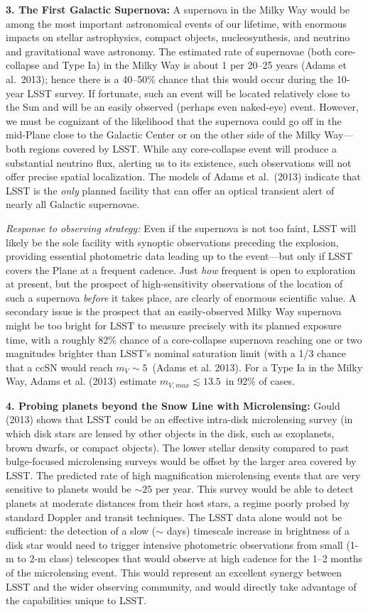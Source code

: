 {\bf 3. The First Galactic Supernova:} A supernova in the Milky Way
would be among the most important astronomical events of our lifetime,
with enormous impacts on stellar astrophysics, compact objects,
nucleosynthesis, and neutrino and gravitational wave astronomy. The
estimated rate of supernovae (both core-collapse and Type Ia) in the
Milky Way is about 1 per 20--25 years (Adams et al.~2013); hence there
is a 40--50\% chance that this would occur during the 10-year LSST
survey. If fortunate, such an event will be located relatively close
to the Sun and will be an easily observed (perhaps even naked-eye)
event. However, we must be cognizant of the likelihood that the
supernova could go off in the mid-Plane close to the Galactic Center
or on the other side of the Milky Way---both regions covered by
LSST. While any core-collapse event will produce a substantial
neutrino flux, alerting us to its existence, such observations will
not offer precise spatial localization. The models of Adams et
al.~(2013) indicate that LSST is the \emph{only} planned facility that
can offer an optical transient alert of nearly all Galactic
supernovae. 

{\it Response to observing strategy:} Even if the supernova is not too
faint, LSST will likely be the sole facility with synoptic
observations preceding the explosion, providing essential photometric
data leading up to the event---but only if LSST covers the Plane at a
frequent cadence. Just {\it how} frequent is open to exploration at
present, but the prospect of high-sensitivity observations of the
location of such a supernova {\it before} it takes place, are clearly
of enormous scientific value. A secondary issue is the prospect that
an easily-observed Milky Way supernova might be too bright for LSST to
measure precisely with its planned exposure time, with a roughly 82\%
chance of a core-collapse supernova reaching one or two magnitudes
brighter than LSST's nominal saturation limit (with a 1/3 chance that
a ccSN would reach $m_V \sim 5$~(Adams et al. 2013). For a Type Ia in
the Milky Way, Adams et al. (2013) estimate $m_{V, max} \lesssim
13.5$~in 92\% of cases.

{\bf 4. Probing planets beyond the Snow Line with Microlensing:} Gould
(2013) shows that LSST could be an effective intra-disk microlensing
survey (in which disk stars are lensed by other objects in the disk,
such as exoplanets, brown dwarfs, or compact objects). The lower
stellar density compared to past bulge-focused microlensing surveys
would be offset by the larger area covered by LSST. The predicted rate
of high magnification microlensing events that are very sensitive to
planets would be $\sim 25$ per year. This survey would be able to
detect planets at moderate distances from their host stars, a regime
poorly probed by standard Doppler and transit techniques. The LSST
data alone would not be sufficient: the detection of a slow ($\sim$
days) timescale increase in brightness of a disk star would need to
trigger intensive photometric observations from small (1-m to 2-m
class) telescopes that would observe at high cadence for the 1--2
months of the microlensing event. This would represent an excellent
synergy between LSST and the wider observing community, and would
directly take advantage of the capabilities unique to LSST.

